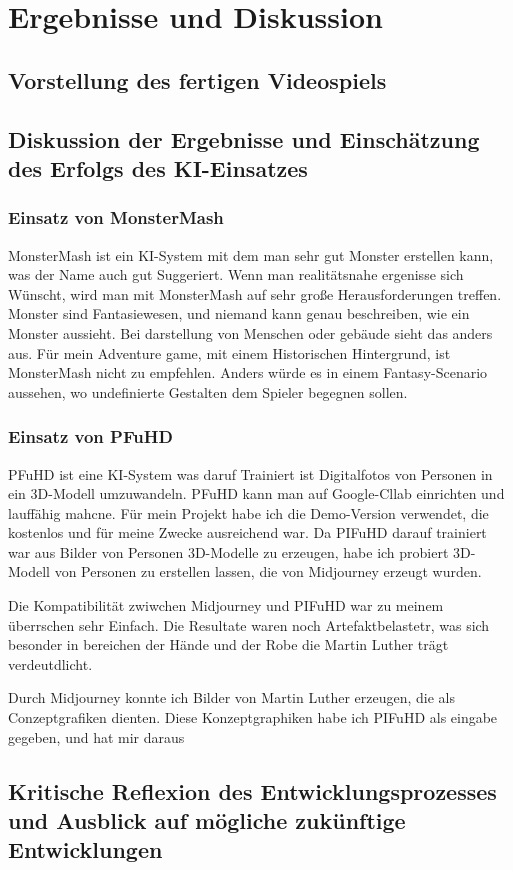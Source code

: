 \documentclass[12pt,a4paper,bibliography=totocnumbered,listof=totocnumbered]{scrartcl}
\begin{document}
\section{Ergebnisse und Diskussion}
\subsection{Vorstellung des fertigen Videospiels}
\subsection{Diskussion der Ergebnisse und Einschätzung des Erfolgs des KI-Einsatzes}
\subsubsection{Einsatz von MonsterMash}
	MonsterMash ist ein KI-System mit dem man sehr gut Monster erstellen kann, was der Name auch gut Suggeriert. Wenn man realitätsnahe ergenisse sich Wünscht, wird man mit MonsterMash auf sehr große Herausforderungen treffen. Monster sind Fantasiewesen, und niemand kann genau beschreiben, wie ein Monster aussieht. Bei darstellung von Menschen oder gebäude sieht das anders aus. Für mein Adventure game, mit einem Historischen Hintergrund, ist MonsterMash nicht zu empfehlen. Anders würde es in einem Fantasy-Scenario aussehen, wo undefinierte Gestalten dem Spieler begegnen sollen.
\subsubsection{Einsatz von PFuHD}
PFuHD ist eine KI-System was daruf Trainiert ist Digitalfotos von Personen in ein 3D-Modell umzuwandeln. PFuHD kann man auf Google-Cllab einrichten und lauffähig mahcne. Für mein Projekt habe ich die Demo-Version verwendet, die kostenlos und für meine Zwecke ausreichend war.
Da PIFuHD darauf trainiert war aus Bilder von Personen 3D-Modelle zu erzeugen, habe ich probiert 3D-Modell von Personen zu erstellen lassen, die von Midjourney erzeugt wurden.

Die Kompatibilität zwiwchen Midjourney und PIFuHD war zu meinem überrschen sehr Einfach. Die Resultate waren noch Artefaktbelastetr, was sich besonder in bereichen der Hände und der Robe die Martin Luther trägt verdeutdlicht.

Durch Midjourney konnte ich Bilder von  Martin Luther erzeugen, die als Conzeptgrafiken dienten. Diese Konzeptgraphiken habe ich PIFuHD als eingabe gegeben, und hat mir daraus
\subsection{Kritische Reflexion des Entwicklungsprozesses und Ausblick auf mögliche zukünftige Entwicklungen}
\end{document}
